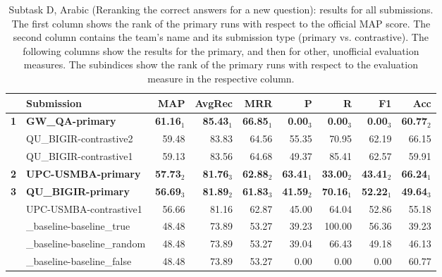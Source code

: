 \begin{table*}[tbh]
\begin{center}
\begin{tabular}{clrrrrrrr}
& \bf Submission & \bf MAP & \bf \scriptsize AvgRec & \bf \scriptsize MRR & \bf \scriptsize P & \bf \scriptsize R & \bf \scriptsize F1 & \bf \scriptsize Acc\\
\hline
\bf 1 & \bf GW\_QA-primary & \bf 61.16$_{1}$ & \bf \scriptsize 85.43$_{1}$ & \bf \scriptsize 66.85$_{1}$ & \bf \scriptsize  0.00$_{3}$ & \bf \scriptsize  0.00$_{3}$ & \bf \scriptsize  0.00$_{3}$ & \bf \scriptsize 60.77$_{2}$ \\
& QU\_BIGIR-contrastive2 & 59.48 & \scriptsize 83.83 & \scriptsize 64.56 & \scriptsize 55.35 & \scriptsize 70.95 & \scriptsize 62.19 & \scriptsize 66.15 \\
& QU\_BIGIR-contrastive1 & 59.13 & \scriptsize 83.56 & \scriptsize 64.68 & \scriptsize 49.37 & \scriptsize 85.41 & \scriptsize 62.57 & \scriptsize 59.91 \\
\bf 2 & \bf UPC-USMBA-primary & \bf 57.73$_{2}$ & \bf \scriptsize 81.76$_{3}$ & \bf \scriptsize 62.88$_{2}$ & \bf \scriptsize 63.41$_{1}$ & \bf \scriptsize 33.00$_{2}$ & \bf \scriptsize 43.41$_{2}$ & \bf \scriptsize 66.24$_{1}$ \\
\bf 3 & \bf QU\_BIGIR-primary & \bf 56.69$_{3}$ & \bf \scriptsize 81.89$_{2}$ & \bf \scriptsize 61.83$_{3}$ & \bf \scriptsize 41.59$_{2}$ & \bf \scriptsize 70.16$_{1}$ & \bf \scriptsize 52.22$_{1}$ & \bf \scriptsize 49.64$_{3}$ \\
& UPC-USMBA-contrastive1 & 56.66 & \scriptsize 81.16 & \scriptsize 62.87 & \scriptsize 45.00 & \scriptsize 64.04 & \scriptsize 52.86 & \scriptsize 55.18 \\
& \_baseline-baseline\_true & 48.48 & \scriptsize 73.89 & \scriptsize 53.27 & \scriptsize 39.23 & \scriptsize 100.00 & \scriptsize 56.36 & \scriptsize 39.23 \\
& \_baseline-baseline\_random & 48.48 & \scriptsize 73.89 & \scriptsize 53.27 & \scriptsize 39.04 & \scriptsize 66.43 & \scriptsize 49.18 & \scriptsize 46.13 \\
& \_baseline-baseline\_false & 48.48 & \scriptsize 73.89 & \scriptsize 53.27 & \scriptsize  0.00 & \scriptsize  0.00 & \scriptsize  0.00 & \scriptsize 60.77 \\
\end{tabular}
\caption{Subtask D, Arabic (Reranking the correct answers for a new question): results for all submissions. The first column shows the rank of the primary runs with respect to the official MAP score. The second column contains the team's name and its submission type (primary vs. contrastive). The following columns show the results for the primary, and then for other, unofficial evaluation measures. The subindices show the rank of the primary runs with respect to the evaluation measure in the respective column.}
\label{table:results}
\end{center}
\end{table*}
